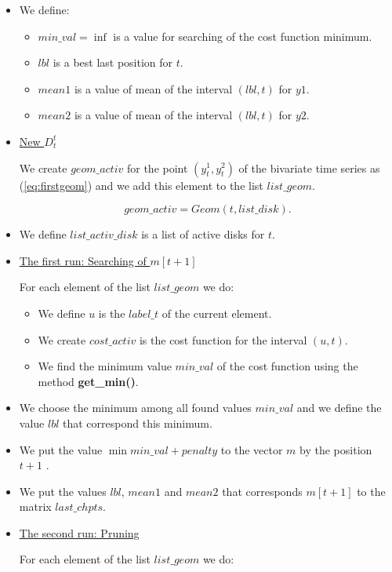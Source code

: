 \documentclass{report}
\begin{document}
\begin{itemize}
	\item We define:
	\begin{itemize}
		\item $min\_val = \inf$  is a value for searching  of the cost function minimum.
		\item $lbl$ is a best last position for $t$.
		\item $mean1$ is a value of mean of the interval $(lbl, t)$ for $y1$.
		\item $mean2$ is a value of mean of the interval $(lbl, t)$ for $y2$.
	\end{itemize}
	\item \underline {New $D_t^t$}

	 We create $geom\_activ$ for the  point $(y^1_t, y^2_t)$ of the bivariate time series as (\ref{eq:firstgeom})  and we add this element to the list $list\_geom$.
	
	\begin{equation}
		geom\_activ = Geom(t, list\_disk).
		\label{eq:firstgeom}
	\end{equation}	
	\item We define $list\_activ\_disk$ is a list of active disks for $t$.	
	\item \underline {The first run: Searching of $m[t+1]$}
	
	For each element of the list $list\_geom$ we do:
		
	\begin{itemize}
		\item We define $u$ is the $label\_t$ of the current element.
		\item We create $cost\_activ$  is the cost function for the interval $(u,t)$.	
		\item We find the minimum value  $min\_val$ of the cost function using the method {\bfseries get\_min()}. 
	\end{itemize}
	\item We choose the minimum  among all found values ${min\_val}$ and we define the value $lbl$ that correspond this minimum.	
	\item We put the value $\min{min\_val} + penalty$ to the vector $m$  by the position $t+1$ .	
	\item We put the values  $lbl$, $mean1$ and $mean2$ that corresponds $m[t+1]$ to the matrix $last\_chpts$.
	\item \underline {The second run: Pruning}
	
	For each element of the list $list\_geom$ we do:
	

\end{itemize}
\end{document}
